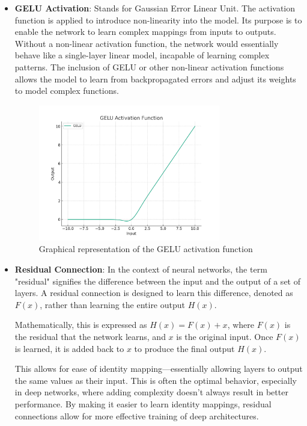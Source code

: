 \documentclass[a4paper,12pt,openright]{book}
\begin{document}
\begin{itemize}
    
   \item \textbf{GELU Activation}: Stands for Gaussian Error Linear Unit. The activation function is applied to introduce non-linearity into the model. Its purpose is to enable the network to learn complex mappings from inputs to outputs. Without a non-linear activation function, the network would essentially behave like a single-layer linear model, incapable of learning complex patterns. The inclusion of GELU or other non-linear activation functions allows the model to learn from backpropagated errors and adjust its weights to model complex functions.
   
    \begin{figure}[ht]
        \centering
        \includegraphics[width=0.75\textwidth]{images/gelu.png}
        \caption{Graphical representation of the GELU activation function}
    \end{figure}

   \item \textbf{Residual Connection}:
In the context of neural networks, the term "residual" signifies the difference between the input and the output of a set of layers. A residual connection is designed to learn this difference, denoted as \( F(x) \), rather than learning the entire output \( H(x) \).

Mathematically, this is expressed as \( H(x) = F(x) + x \), where \( F(x) \) is the residual that the network learns, and \( x \) is the original input. Once \( F(x) \) is learned, it is added back to \( x \) to produce the final output \( H(x) \).

This allows for ease of identity mapping—essentially allowing layers to output the same values as their input. This is often the optimal behavior, especially in deep networks, where adding complexity doesn't always result in better performance. By making it easier to learn identity mappings, residual connections allow for more effective training of deep architectures.
  
\end{itemize}
\end{document}
